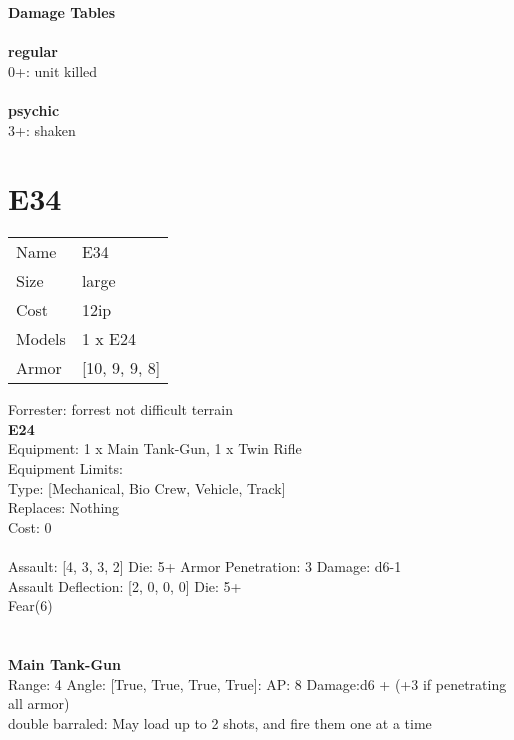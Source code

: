 {\bf Damage Tables} \\
\ \\ {\bf regular } \\
0+: unit killed \\
\ \\ {\bf psychic } \\
3+: shaken \\










\pagebreak\pagebreak

\section{ E34 }

\begin{tabular}{ll}
  Name & E34 \\
  Size & large\\
  Cost & 12ip\\
  Models & 1 x E24\\
  Armor & [10, 9, 9, 8]\\
\end{tabular}

\noindent Forrester: forrest not difficult terrain\\ 


{\bf E24 } \\
Equipment: 1 x Main Tank-Gun, 1 x Twin Rifle \\
Equipment Limits:  \\
Type: [Mechanical, Bio Crew, Vehicle, Track] \\
Replaces: Nothing \\
Cost: 0\\
\ \\
Assault: [4, 3, 3, 2] Die: 5+ Armor Penetration: 3 Damage: d6-1 \\
Assault Deflection: [2, 0, 0, 0] Die: 5+\\
\indent Fear(6)\\ 
 
\ \\

\ \\
{\bf Main Tank-Gun } \\



Range: 4  Angle: [True, True, True, True]: AP: 8 Damage:d6 + (+3 if penetrating all armor) \\
double barraled: May load up to 2 shots, and fire them one at a time\\ 





